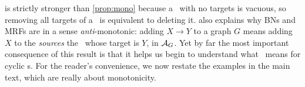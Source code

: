  is strictly stronger than \cref{prop:mono}
because a \arc\ with no targets is vacuous, so
removing all targets of a \arc\ is equivalent to deleting it.
%
 also explains why BNs and MRFs are in a sense \emph{anti}-monotonic: adding $X \to Y$ to a graph $G$ means adding $X$ to the \emph{sources} the \arc\ whose target is $Y$, 
in $\mathcal A_G$.
%
Yet by far the most important consequence of this result is that it
helps us begin to understand what \scibility\ means for cyclic \hgraph s.
For the reader's convenience, we now restate the examples in the main text,
which are really about monotonicity.

